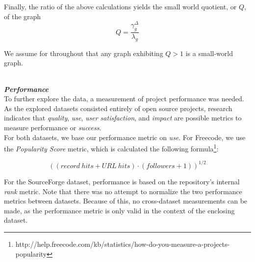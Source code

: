 \documentclass{proc}
\begin{document}
Finally, the ratio of the above calculations yields the small world quotient, or $Q$, of the graph
\[Q = \frac{\gamma^{\Delta}_g }{\lambda_g} \]

We assume for throughout that any graph exhibiting {$Q > 1$} is a small-world graph.

\noindent\\\textit{\textbf{Performance}}\\
To further explore the data, a measurement of project performance was needed. As the explored datasets consisted entirely of open source projects, research indicates that \textit{quality}, \textit{use}, \textit{user satisfaction}, and \textit{impact} are possible metrics to measure performance or \textit{success}\cite{crowston2003defining}.\\

For both datasets, we base our performance metric on \textit{use}. For Freecode, we use the \textit{Popularity Score} metric, which is calculated the following formula\footnote{http://help.freecode.com/kb/statistics/how-do-you-measure-a-projects-popularity}:

\[ ((record\ hits + URL\ hits) \cdot (followers + 1))^{1/2} \]

For the SourceForge dataset, performance is based on the repository's internal \textit{rank} metric. Note that there was no attempt to normalize the two performance metrics between datasets. Because of this, no cross-dataset measurements can be made, as the performance metric is only valid in the context of the enclosing dataset. 
\end{document}
